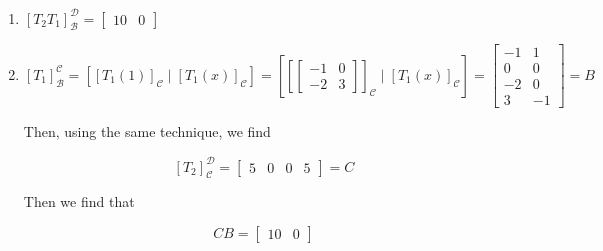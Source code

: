 \begin{sol}
	\begin{enumerate}
		\item $[T_2T_1]^\mathcal{D}_\mathcal{B} = \begin{bmatrix}
			10 & 0
		\end{bmatrix}$
		\item \[[T_1]_\mathcal{B}^\mathcal{C} = \left[\left[T_1(1)\right]_\mathcal{C} \mid \left[T_1(x)\right]_\mathcal{C}\right] = \left[\left[\begin{bmatrix}
			-1&0\\-2&3
		\end{bmatrix}\right]_\mathcal{C} \mid \left[T_1(x)\right]_\mathcal{C}\right] = \begin{bmatrix}
			-1&1\\0&0\\-2&0\\3&-1
		\end{bmatrix} = B\]

		Then, using the same technique, we find

		\[\left[T_2\right]^\mathcal{D}_\mathcal{C} = \begin{bmatrix}
			5&0&0&5
		\end{bmatrix} = C\]

		Then we find that 

		\[CB = \begin{bmatrix}
			10&0
		\end{bmatrix}\]
	\end{enumerate}
\end{sol}